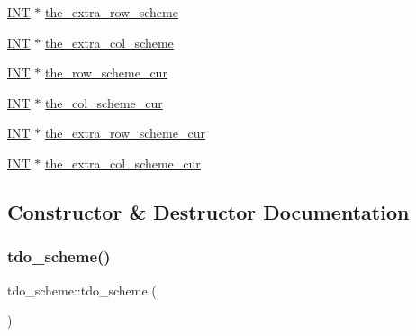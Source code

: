 \begin{DoxyCompactItemize}
\mbox{\hyperlink{galois_8h_a09fddde158a3a20bd2dcadb609de11dc}{I\+NT}} $\ast$ \mbox{\hyperlink{classtdo__scheme_a5a3a932d2e97ba4d7fc77ec9991ebfc3}{the\+\_\+extra\+\_\+row\+\_\+scheme}}
\item 
\mbox{\hyperlink{galois_8h_a09fddde158a3a20bd2dcadb609de11dc}{I\+NT}} $\ast$ \mbox{\hyperlink{classtdo__scheme_ad0f9c64a95f8af4769e8cd711f3d498b}{the\+\_\+extra\+\_\+col\+\_\+scheme}}
\item 
\mbox{\hyperlink{galois_8h_a09fddde158a3a20bd2dcadb609de11dc}{I\+NT}} $\ast$ \mbox{\hyperlink{classtdo__scheme_a005a963063dd229b3e2638f69c7b584b}{the\+\_\+row\+\_\+scheme\+\_\+cur}}
\item 
\mbox{\hyperlink{galois_8h_a09fddde158a3a20bd2dcadb609de11dc}{I\+NT}} $\ast$ \mbox{\hyperlink{classtdo__scheme_add7fe93b80f85cf3068302eea4578eea}{the\+\_\+col\+\_\+scheme\+\_\+cur}}
\item 
\mbox{\hyperlink{galois_8h_a09fddde158a3a20bd2dcadb609de11dc}{I\+NT}} $\ast$ \mbox{\hyperlink{classtdo__scheme_abbeed344a4b0410a9c2e58dbb71a6f62}{the\+\_\+extra\+\_\+row\+\_\+scheme\+\_\+cur}}
\item 
\mbox{\hyperlink{galois_8h_a09fddde158a3a20bd2dcadb609de11dc}{I\+NT}} $\ast$ \mbox{\hyperlink{classtdo__scheme_ac7b7337ba675d942d7ad79b0d040a243}{the\+\_\+extra\+\_\+col\+\_\+scheme\+\_\+cur}}
\end{DoxyCompactItemize}


\subsection{Constructor \& Destructor Documentation}
\mbox{\label{classtdo__scheme_acbcae27463e33e17820c87864f0694f4}} 
\subsubsection{\texorpdfstring{tdo\+\_\+scheme()}{tdo\_scheme()}}
{\footnotesize\ttfamily tdo\+\_\+scheme\+::tdo\+\_\+scheme (\begin{DoxyParamCaption}{ }\end{DoxyParamCaption})}

\mbox{\label{classtdo__scheme_ac1faaab1344d50800638910b29f960c6}} 

